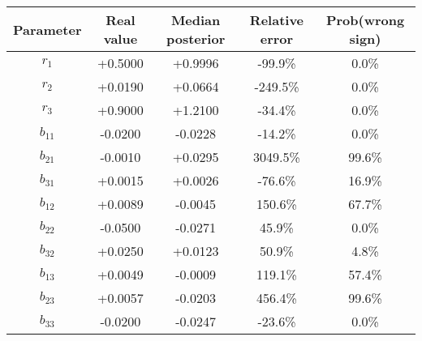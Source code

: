 \documentclass{article}
\begin{document}
\begin{tabular}{ccccc}
\textbf{Parameter}& \textbf{Real value} & \textbf{Median posterior} &\textbf{Relative error}& \textbf{Prob(wrong sign)}\\\hline
$r_{1}$ & +0.5000 & +0.9996& -99.9\% & 0.0\%\\
$r_{2}$ & +0.0190 & +0.0664& -249.5\% & 0.0\%\\
$r_{3}$ & +0.9000 & +1.2100& -34.4\% & 0.0\%\\
$b_{11}$ & -0.0200 & -0.0228& -14.2\% & 0.0\%\\
$b_{21}$ & -0.0010 & +0.0295& 3049.5\% & 99.6\%\\
$b_{31}$ & +0.0015 & +0.0026& -76.6\% & 16.9\%\\
$b_{12}$ & +0.0089 & -0.0045& 150.6\% & 67.7\%\\
$b_{22}$ & -0.0500 & -0.0271& 45.9\% & 0.0\%\\
$b_{32}$ & +0.0250 & +0.0123& 50.9\% & 4.8\%\\
$b_{13}$ & +0.0049 & -0.0009& 119.1\% & 57.4\%\\
$b_{23}$ & +0.0057 & -0.0203& 456.4\% & 99.6\%\\
$b_{33}$ & -0.0200 & -0.0247& -23.6\% & 0.0\%\\
\hline
\end{tabular}	
\end{document}
